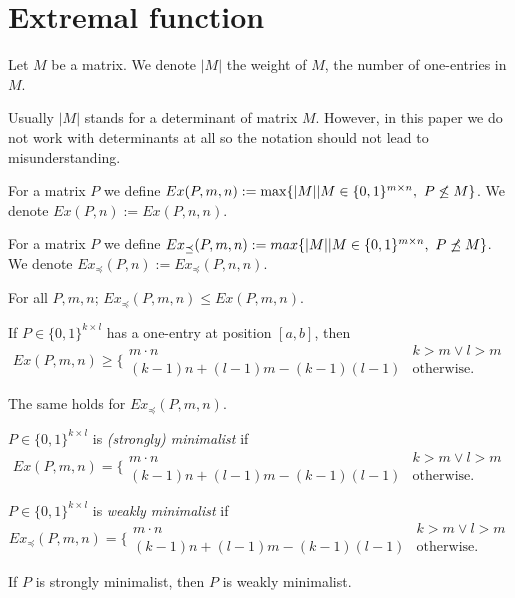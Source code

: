 \section{Extremal function}
\begin{ntn}
Let $M$ be a matrix. We denote $|M|$ the weight of $M$, the number of one-entries in $M$.
\end{ntn}
Usually $|M|$ stands for a determinant of matrix $M$. However, in this paper we do not work with determinants at all so the notation should not lead to misunderstanding.
\begin{defn}
For a matrix $P$ we define $Ex(P,m,n):=\max\{|M||M\in\Mat,\ \PnsmM\}$. We denote $Ex(P,n):=Ex(P,n,n)$.
\end{defn}
\begin{defn}
For a matrix $P$ we define $Ex_{\preceq}(P,m,n):=max\{|M||M\in\Mat,\ \PnimM\}$. We denote $Ex_{\preceq}(P,n):=Ex_{\preceq}(P,n,n)$.
\end{defn}
\begin{obs}
For all $P,m,n$; $Ex_{\preceq}(P,m,n)\leq Ex(P,m,n)$.
\end{obs}
\begin{obs}
If $P\in\{0,1\}^{k\times l}$ has a one-entry at position $[a,b]$, then $$Ex(P,m,n)\geq\Big\{\begin{array}{ll}
m\cdot n & k>m\vee l>m \\
(k-1)n+(l-1)m-(k-1)(l-1) & \text{otherwise.}
\end{array}$$
\end{obs}
\begin{obs}
The same holds for $Ex_{\preceq}(P,m,n).$
\end{obs}
\begin{defn}
$P\in\{0,1\}^{k\times l}$ is \emph{(strongly) minimalist} if
$$Ex(P,m,n)=\Big\{\begin{array}{ll}
m\cdot n & k>m\vee l>m \\
(k-1)n+(l-1)m-(k-1)(l-1) & \text{otherwise.}
\end{array}$$
\end{defn}
\begin{defn}
$P\in\{0,1\}^{k\times l}$ is \emph{weakly minimalist} if
$$Ex_{\preceq}(P,m,n)=\Big\{\begin{array}{ll}
m\cdot n & k>m\vee l>m \\
(k-1)n+(l-1)m-(k-1)(l-1) & \text{otherwise.}
\end{array}$$
\end{defn}
\begin{obs}
If $P$ is strongly minimalist, then $P$ is weakly minimalist.
\end{obs}

